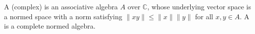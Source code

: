 A (complex)  is an associative algebra $A$ over $\mathbb{C}$, whose underlying vector space is a normed space with a norm satisfying $\|xy\| \leq \|x\| \|y\|$ for all $x, y \in A$. A  is a complete normed algebra.
